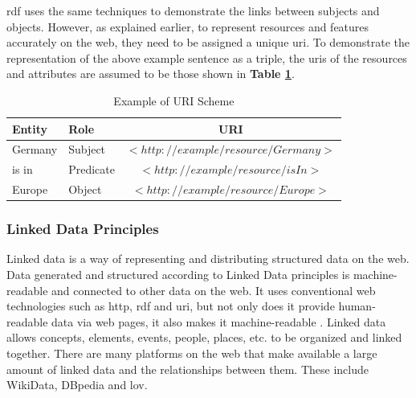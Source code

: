     \acrshort{rdf} uses the same techniques to demonstrate the links between subjects and objects. However, as explained earlier, to represent resources and features accurately on the web, they need to be assigned a unique \acrshort{uri}. To demonstrate the representation of the above example sentence as a triple, the \acrshort{uri}s of the resources and attributes are assumed to be those shown in \textbf{Table \ref{tab:rdf-example-uri}}.
    
    \begin{table}[h]
        \centering
	    {
	    \begin{tabular}{ | m{2.5cm} | m{2.5cm} | c | }
            \hline
            \rowcolor{teal!30} \textbf{Entity} & \textbf{Role} & \textbf{URI} \\
            
            \hline
            Germany  & Subject & $<http://example/resource/Germany>$\\
            
            \hline
            is in  & Predicate & $<http://example/resource/isIn>$\\
            
            \hline
            Europe  & Object & $<http://example/resource/Europe>$\\
            
            \hline
        \end{tabular}}
        \caption{\label{tab:rdf-example-uri} Example of URI Scheme}
    \end{table}

    \subsubsection{Linked Data Principles}
    Linked data is a way of representing and distributing structured data on the web. Data generated and structured according to Linked Data principles is machine-readable and connected to other data on the web. It uses conventional web technologies such as \acrshort{http}, \acrshort{rdf} and \acrshort{uri}, but not only does it provide human-readable data via web pages, it also makes it machine-readable \cite{bizer2008linked}. Linked data allows concepts, elements, events, people, places, etc. to be organized and linked together. There are many platforms on the web that make available a large amount of linked data and the relationships between them. These include WikiData, DBpedia and \acrfull{lov}.\\

